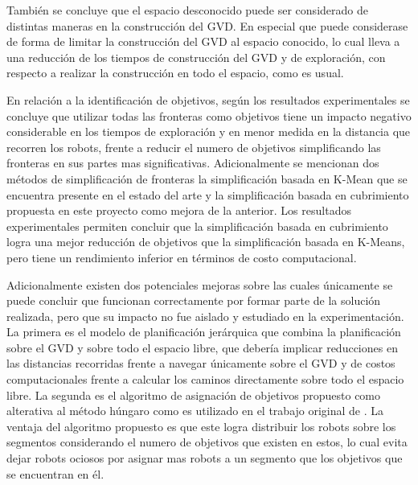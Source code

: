 También se concluye que el espacio desconocido puede ser considerado de
distintas maneras en la construcción del GVD. En especial que puede considerase de
forma de limitar la construcción del GVD al espacio conocido, lo cual lleva a
una reducción de los tiempos de construcción del GVD y de exploración, con
respecto a realizar la construcción en todo el espacio, como es usual.


En relación a la identificación de objetivos, según los resultados
experimentales se concluye que utilizar todas las fronteras como objetivos
tiene un impacto negativo considerable en los tiempos de exploración y en menor
medida en la distancia que recorren los robots, frente a reducir el numero de
objetivos simplificando las fronteras en sus partes mas significativas.
Adicionalmente se mencionan dos métodos de simplificación de fronteras la
simplificación basada en K-Mean que se encuentra presente en el estado del arte y
la simplificación basada en cubrimiento propuesta en este proyecto como mejora
de la anterior. Los resultados experimentales permiten concluir que la
simplificación basada en cubrimiento logra una mejor reducción de objetivos que la
simplificación basada en K-Means, pero tiene un rendimiento inferior en
términos de costo computacional. 

Adicionalmente existen dos potenciales mejoras sobre las cuales únicamente se
puede concluir que funcionan correctamente por formar parte de la solución
realizada, pero que su impacto no fue aislado y estudiado en la
experimentación. La primera es el modelo de planificación jerárquica que
combina la planificación sobre el GVD y sobre todo el espacio libre, que
debería implicar reducciones en las distancias recorridas frente a navegar
únicamente sobre el GVD y de costos computacionales frente a calcular los
caminos directamente sobre todo el espacio libre. La segunda es el algoritmo de
asignación de objetivos propuesto como alterativa al método húngaro como es
utilizado en el trabajo original de \cite{wurm2008coordinated}. La ventaja del
algoritmo propuesto es que este logra distribuir los robots sobre los segmentos
considerando el numero de objetivos que existen en estos, lo cual evita dejar
robots ociosos por asignar mas robots a un segmento que los objetivos que se
encuentran en él.



